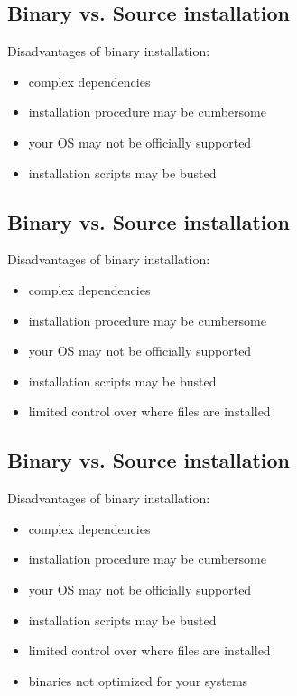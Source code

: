 \documentclass[xga]{xdvislides}
\begin{document}
\subsection{Binary vs. Source installation}
Disadvantages of binary installation:
\begin{itemize}
	\item complex dependencies
	\item installation procedure may be cumbersome
	\item your OS may not be officially supported
	\item installation scripts may be busted
\end{itemize}

\subsection{Binary vs. Source installation}
Disadvantages of binary installation:
\begin{itemize}
	\item complex dependencies
	\item installation procedure may be cumbersome
	\item your OS may not be officially supported
	\item installation scripts may be busted
	\item limited control over where files are installed
\end{itemize}

\subsection{Binary vs. Source installation}
Disadvantages of binary installation:
\begin{itemize}
	\item complex dependencies
	\item installation procedure may be cumbersome
	\item your OS may not be officially supported
	\item installation scripts may be busted
	\item limited control over where files are installed
	\item binaries not optimized for your systems
\end{itemize}
\end{document}
